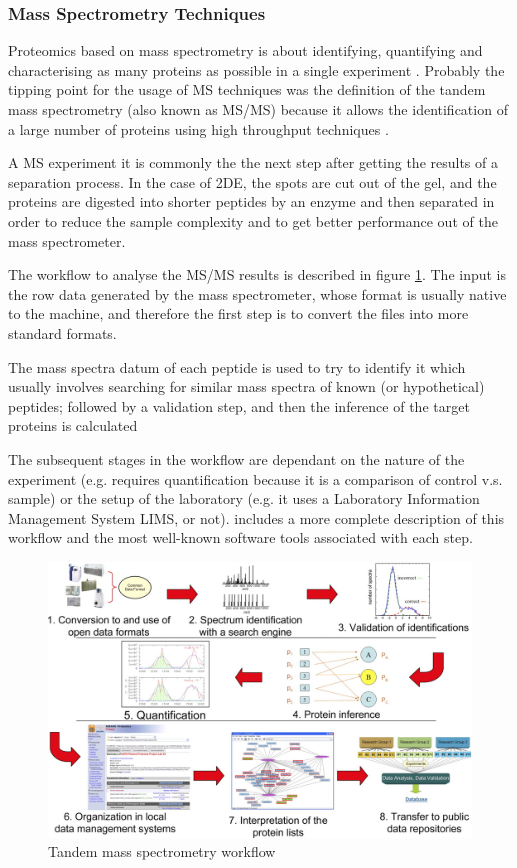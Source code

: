 \subsubsection{Mass Spectrometry Techniques}
Proteomics based on mass spectrometry is about identifying, quantifying and characterising as many proteins as possible in a single experiment . Probably the tipping point for the usage of MS techniques was the definition of the tandem mass spectrometry (also known as MS/MS) because it allows the identification of a large number of proteins using high throughput techniques .

A MS experiment it is commonly the the next step after getting the results of a separation process. In the case of 2DE, the spots are cut out of the gel, and the proteins are digested into shorter peptides by an enzyme and then separated in order to reduce the sample complexity and to get better performance out of the mass spectrometer.

The workflow to analyse the MS/MS results is described in figure \ref{fig:ms_workflow}. The input is the row data generated by the mass spectrometer, whose format is usually native to the machine, and therefore the first step is to convert the files into more standard formats. 

The mass spectra datum of each peptide is used to try to identify it which usually involves searching for similar mass spectra of known (or hypothetical) peptides; followed by a validation step, and then the inference of the target proteins is calculated

The subsequent stages in the workflow are dependant on the nature of the experiment (e.g. requires quantification because it is a comparison of control v.s. sample) or the setup of the laboratory (e.g. it uses a Laboratory Information Management System LIMS, or not). \cite{DEU2008} includes a more complete description of this workflow and the most well-known software tools associated with each step.

\begin{figure}  
\centering
\includegraphics[width=6in]{figures/ms_workflow.png}
\caption[Tandem mass spectrometry workflow.]{Tandem mass spectrometry workflow
\label{fig:ms_workflow}}
\end{figure}


